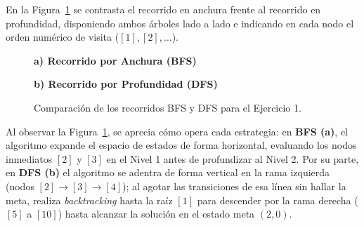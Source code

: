 \documentclass[11pt,letterpaper]{article}
\begin{document}
En la Figura~\ref{fig:jarras_bfs_dfs} se contrasta el recorrido en anchura frente al recorrido en profundidad, disponiendo ambos árboles lado a lado e indicando en cada nodo el orden numérico de visita ($[1], [2], \dots$).

\begin{figure}[H]
\centering
\begin{minipage}[t]{0.48\linewidth}
\centering
\textbf{\scriptsize a) Recorrido por Anchura (BFS)}\\[4pt]
\end{minipage}
\hfill
\begin{minipage}[t]{0.48\linewidth}
\centering
\textbf{\scriptsize b) Recorrido por Profundidad (DFS)}\\[4pt]
\end{minipage}
\caption{Comparación de los recorridos BFS y DFS para el Ejercicio 1.}
\label{fig:jarras_bfs_dfs}
\end{figure}

Al observar la Figura~\ref{fig:jarras_bfs_dfs}, se aprecia cómo opera cada estrategia: en \textbf{BFS (a)}, el algoritmo expande el espacio de estados de forma horizontal, evaluando los nodos inmediatos $[2]$ y $[3]$ en el Nivel 1 antes de profundizar al Nivel 2. Por su parte, en \textbf{DFS (b)} el algoritmo se adentra de forma vertical en la rama izquierda (nodos $[2] \to [3] \to [4]$); al agotar las transiciones de esa línea sin hallar la meta, realiza \textit{backtracking} hasta la raíz $[1]$ para descender por la rama derecha ($[5]$ a $[10]$) hasta alcanzar la solución en el estado meta $(2,0)$.
\end{document}
